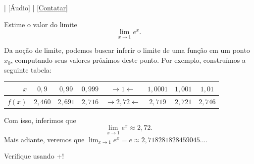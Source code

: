 \begin{flushright}
  [Vídeo] | [Áudio] | \href{https://phkonzen.github.io/notas/contato.html}{[Contatar]}
\end{flushright}

\begin{exeresol}
  Estime o valor do limite
  \begin{equation}
    \lim_{x\to 1} e^x.
  \end{equation}
\end{exeresol}
\begin{resol}
  Da noção de limite, podemos buscar inferir o limite de uma função em um ponto $x_0$, computando seus valores próximos deste ponto. Por exemplo, construímos a seguinte tabela:
  
  \begin{tabular}{r|ccc|c|ccc}
    $x$ & $0,9$ & $0,99$ & $0,999$ & $\rightarrow 1 \leftarrow$ & $1,0001$ & $1,001$ & $1,01$\\\hline
    $f(x)$ & $2,460$ & $2,691$ & $2,716$ & $\rightarrow 2,72 \leftarrow$ & $2,719$ & $2,721$ & $2,746$
  \end{tabular}
  
  Com isso, inferimos que
  \begin{equation}
    \lim_{x\to 1} e^x \approx 2,72.
  \end{equation}
  Mais adiante, veremos que $\lim_{x\to 1} e^x = e \approx 2,718281828459045 ...$.
  
  \ifispython
  Verifique usando {\python}+{\sympy}!
  \fi
\end{resol}

